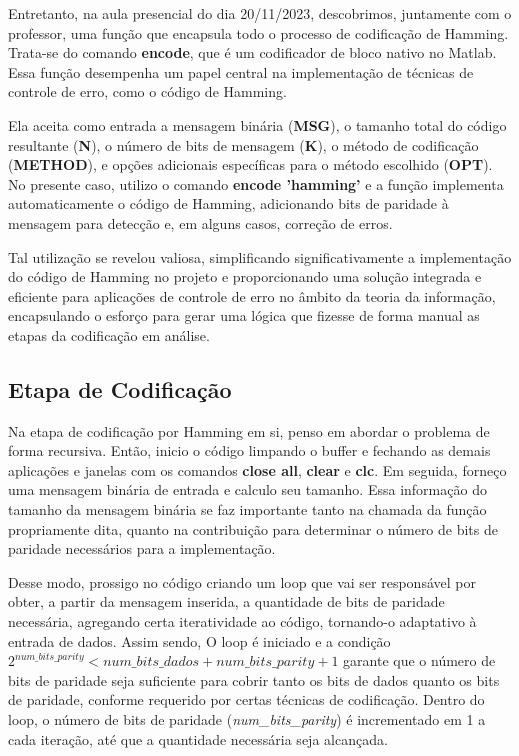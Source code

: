 \documentclass{article}
\begin{document}
Entretanto, na aula presencial do dia 20/11/2023, descobrimos, juntamente com o professor, uma função que encapsula todo o processo de codificação de Hamming. Trata-se do comando \textbf{encode}, que é um codificador de bloco nativo no Matlab. Essa função desempenha um papel central na implementação de técnicas de controle de erro, como o código de Hamming.

Ela aceita como entrada a mensagem binária (\textbf{MSG}), o tamanho total do código resultante (\textbf{N}), o número de bits de mensagem (\textbf{K}), o método de codificação (\textbf{METHOD}), e opções adicionais específicas para o método escolhido (\textbf{OPT}). No presente caso, utilizo o comando \textbf{encode 'hamming'} e a função implementa automaticamente o código de Hamming, adicionando bits de paridade à mensagem para detecção e, em alguns casos, correção de erros. 

Tal utilização se revelou valiosa, simplificando significativamente a implementação do código de Hamming no projeto e proporcionando uma solução integrada e eficiente para aplicações de controle de erro no âmbito da teoria da informação, encapsulando o esforço para gerar uma lógica que fizesse de forma manual as etapas da codificação em análise.

\subsection{Etapa de Codificação}
Na etapa de codificação por Hamming em si, penso em abordar o problema de forma recursiva. Então, inicio o código limpando o buffer e fechando as demais aplicações e janelas com os comandos \textbf{close all}, \textbf{clear} e \textbf{clc}. Em seguida, forneço uma mensagem binária de entrada e calculo seu tamanho. Essa informação do tamanho da mensagem binária se faz importante tanto na chamada da função propriamente dita, quanto na contribuição para determinar o número de bits de paridade necessários para a implementação.

Desse modo, prossigo no código criando um loop que vai ser responsável por obter, a partir da mensagem inserida, a quantidade de bits de paridade necessária, agregando certa iteratividade ao código, tornando-o adaptativo à entrada de dados. Assim sendo, O loop é iniciado e a condição \(2^{num\_bits\_parity} < num\_bits\_dados + num\_bits\_parity + 1\) garante que o número de bits de paridade seja suficiente para cobrir tanto os bits de dados quanto os bits de paridade, conforme requerido por certas técnicas de codificação. Dentro do loop, o número de bits de paridade (\textit{num\_bits\_parity}) é incrementado em 1 a cada iteração, até que a quantidade necessária seja alcançada. 
\end{document}
